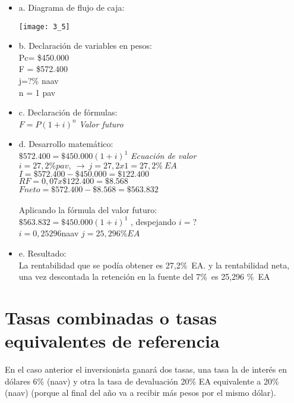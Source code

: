 \begin{itemize}
	\item a. Diagrama de flujo de caja:\\
	\begin{center}
		\texttt{[image: 3\_5]}
	\end{center}
	
	\item b. Declaración de variables en pesos:\\
	Pc= \$450.000\\ F = \$572.400\\ 
	j=?\% naav\\
	n = 1 pav\\
	\item c. Declaración de fórmulas:\\
	$F = P(1+i)^n$\hspace{35} \textit{Valor futuro}\\
	\item d. Desarrollo matemático:\\
	$\$572.400 = \$450.000(1+i)^1$\hspace{35} \textit{Ecuación de valor}\\
	$i=27,2\% pav,\ \rightarrow \ j = 27,2 x1 = 27,2 \%\ EA$ \\
	$I = \$572.400 - \$450.000 = \$122.400$ \\
    $RF = 0,07 x \$122.400= \$8.568$ \\
    $F neto = \$572.400 - \$8.568 = \$563.832$ \\\\
    Aplicando la fórmula del valor futuro: \\
    $\$563.832 = \$450.000(1+i)^1$ , despejando $i = ?$ \\
    $i = 0,25296$naav \equiv  $j = 25,296\% EA$ \\
	\item e. Resultado:\\
    
    La rentabilidad que se podía obtener es 27,2\%\ EA. y la rentabilidad neta, una vez descontada la retención en la fuente del 7\%\ es 25,296 \%\ EA\\

\end{itemize}

\section{Tasas combinadas o tasas equivalentes de referencia}
En el caso anterior el inversionista ganará dos tasas, una tasa la de interés en dólares 6\% (naav) y otra la tasa de devaluación 20\% EA equivalente a 20\% (naav) (porque al final del año va a recibir más pesos por el mismo dólar).\\

